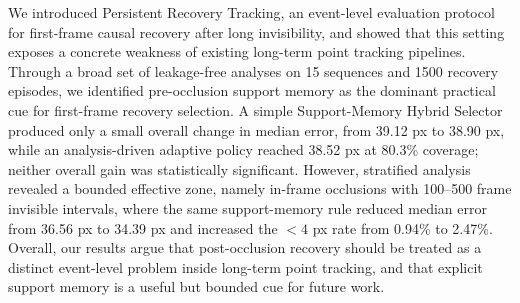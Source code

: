 \documentclass[10pt,journal,compsoc]{IEEEtran}
\newcommand{\method}{Support-Memory Hybrid Selector}
\newcommand{\task}{Persistent Recovery Tracking}
\begin{document}
We introduced \task{}, an event-level evaluation protocol for first-frame causal recovery after long invisibility, and showed that this setting exposes a concrete weakness of existing long-term point tracking pipelines. Through a broad set of leakage-free analyses on 15 sequences and 1500 recovery episodes, we identified pre-occlusion support memory as the dominant practical cue for first-frame recovery selection. A simple \method{} produced only a small overall change in median error, from 39.12 px to 38.90 px, while an analysis-driven adaptive policy reached 38.52 px at 80.3\% coverage; neither overall gain was statistically significant. However, stratified analysis revealed a bounded effective zone, namely in-frame occlusions with 100--500 frame invisible intervals, where the same support-memory rule reduced median error from 36.56 px to 34.39 px and increased the $<4$ px rate from 0.94\% to 2.47\%. Overall, our results argue that post-occlusion recovery should be treated as a distinct event-level problem inside long-term point tracking, and that explicit support memory is a useful but bounded cue for future work.



\end{document}
